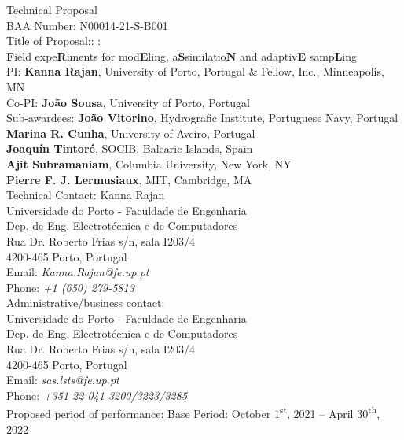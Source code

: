 \begin{titlepage}

\begin{center}
\Large
Technical Proposal\\
BAA Number: N00014-21-S-B001\\
Title of Proposal:: \proje:\\\textbf{F}ield expe\textbf{R}iments for mod\textbf{E}ling, a\textbf{S}similatio\textbf{N} and adaptiv\textbf{E} samp\textbf{L}ing\\


\vspace{+1in}
\large
PI: \textbf{Kanna Rajan}, University of Porto, Portugal \& Fellow, \org Inc., Minneapolis, MN\\
Co-PI: \textbf{Jo\~ao Sousa}, University of Porto, Portugal\\
Sub-awardees: \textbf{Jo\~ao Vitorino}, Hydrografic Institute, Portuguese Navy, Portugal\\
\textbf{Marina R. Cunha}, University of Aveiro, Portugal\\
\textbf{Joaqu\'{i}n Tintor\'{e}}, SOCIB, Balearic Islands, Spain\\
\textbf{Ajit Subramaniam}, Columbia University, New York, NY\\
\textbf{Pierre F. J. Lermusiaux}, MIT, Cambridge, MA\\
\vspace{+1in}
Technical Contact: Kanna Rajan\\
Universidade do Porto - Faculdade de Engenharia\\
Dep. de Eng. Electrot\'{e}cnica e de Computadores\\
Rua Dr. Roberto Frias s/n, sala I203/4\\
4200-465 Porto, Portugal\\
Email: \emph{Kanna.Rajan@fe.up.pt}\\
Phone: \emph{+1 (650) 279-5813}\\
\vspace{0.5in}
Administrative/business contact: \\
Universidade do Porto - Faculdade de Engenharia\\
Dep. de Eng. Electrot\'{e}cnica e de Computadores\\
Rua Dr. Roberto Frias s/n, sala I203/4\\
4200-465 Porto, Portugal\\
Email: \emph{sas.lsts@fe.up.pt}\\
Phone: \emph{+351 22 041 3200/3223/3285}\\
\vspace{0.5in}
Proposed period of performance: Base Period: October
1\textsuperscript{st}, 2021 -- April 30\textsuperscript{th}, 2022


\end{center}
\end{titlepage}
